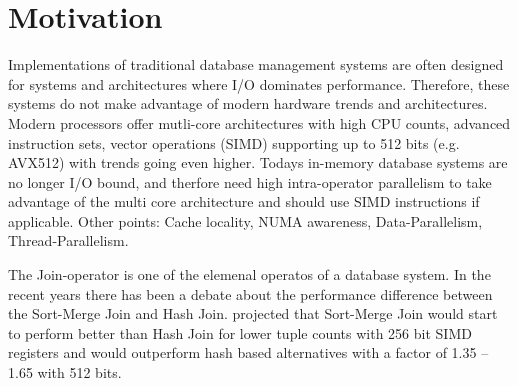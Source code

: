 \section{Motivation}
\label{sec:motivation}

Implementations of traditional database management systems are often designed for systems and
architectures where I/O dominates performance. Therefore, these systems do not make advantage of modern
hardware trends and architectures. Modern processors offer mutli-core architectures with high CPU counts,
advanced instruction sets, vector operations (SIMD) supporting up to 512 bits (e.g. AVX512) with trends going even higher.
Todays in-memory database systems are no longer I/O bound, and therfore need high intra-operator parallelism to take 
advantage of the multi core architecture and should use SIMD instructions if applicable. Other points: Cache locality, NUMA awareness, Data-Parallelism, Thread-Parallelism. 

The Join-operator is one of the elemenal operatos of a database system. In the recent years there has been
a debate about the performance difference between the Sort-Merge Join and Hash Join. \cite{10.14778/1687553.1687564}
projected that Sort-Merge Join would start to perform better than Hash Join for lower tuple counts with 256 bit SIMD registers and would outperform
hash based alternatives with a factor of 1.35 – 1.65 with 512 bits.


